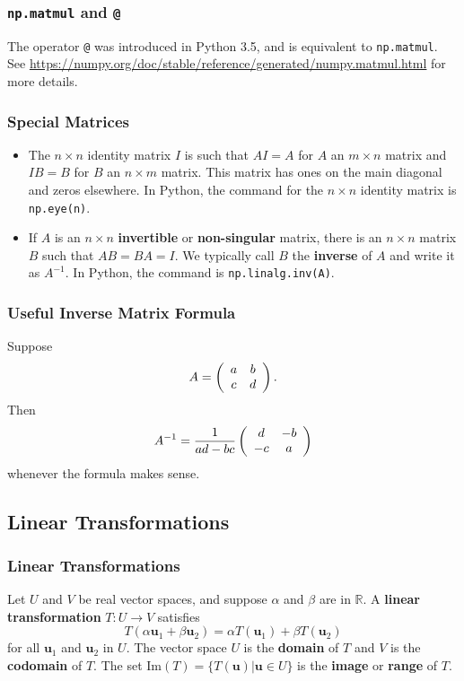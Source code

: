 \documentclass{beamer}
\begin{document}
\begin{frame}
\frametitle{\texttt{np.matmul} and \texttt{@}}
The operator \texttt{@} was introduced in Python 3.5, and is equivalent to \texttt{np.matmul}. See \url{https://numpy.org/doc/stable/reference/generated/numpy.matmul.html} for more details.
\end{frame}

\begin{frame}
\frametitle{Special Matrices}
\begin{itemize} 
\item The $n\times n$ identity matrix $I$ is such that $A I = A$ for $A$ an $m\times n$ matrix and $I B = B$ for $B$ an $n\times m$ matrix. This matrix has ones on the main diagonal and zeros elsewhere. In Python, the command for the $n\times n$ identity matrix is \texttt{np.eye(n)}.
\item If $A$ is an $n\times n$ {\bf invertible} or {\bf non-singular} matrix, there is an $n\times n$ matrix $B$ such that $AB = BA = I$. We typically call $B$ the {\bf inverse} of $A$ and write it as $A^{-1}$. In Python, the command is \texttt{np.linalg.inv(A)}.
\end{itemize}
\end{frame}

\begin{frame}
\frametitle{Useful Inverse Matrix Formula}
Suppose
$$
A = \left(\begin{array}{c c} a	& 	b\\	c	&	d\end{array}\right).
$$
Then
$$
A^{-1} = \frac{1}{ad -bc}\left(\begin{array}{c c}	d	&	-b\\	-c	&	a\end{array}\right)
$$
whenever the formula makes sense.
\end{frame}

\subsection{Linear Transformations}

\begin{frame}
\frametitle{Linear Transformations}
\begin{Definition}
Let $U$ and $V$ be real vector spaces, and suppose $\alpha$ and $\beta$ are in $\mathbb{R}$. A {\bf linear transformation} $T: U\to V$ satisfies 
$$
T(\alpha {\boldsymbol u_1} + \beta {\boldsymbol u_2}) = \alpha T({\boldsymbol u_1}) + \beta T({\boldsymbol u_2})
$$
for all ${\boldsymbol u_1}$ and ${\boldsymbol u_2}$ in $U$. The vector space $U$ is the {\bf domain} of $T$ and $V$ is the {\bf codomain} of $T$. The set $\text{Im}(T) = \{T({\boldsymbol u}) | {\boldsymbol u}\in U\}$ is the {\bf image} or {\bf range} of $T$.
\end{Definition}

\end{frame}
\end{document}
